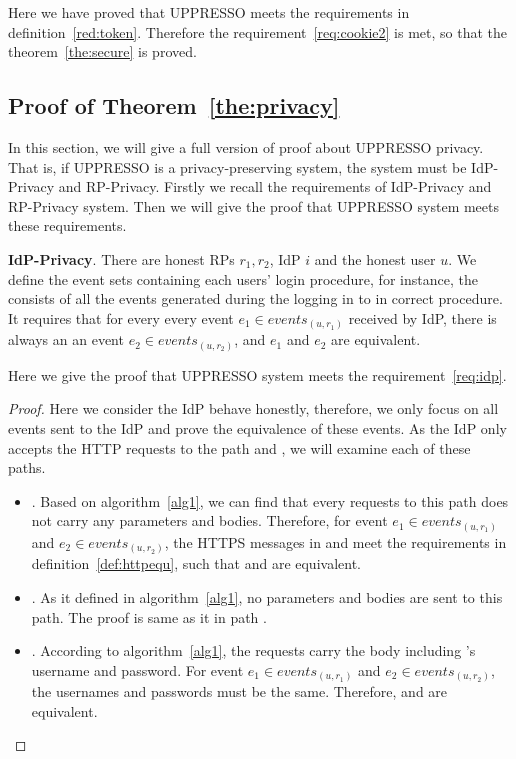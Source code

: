 \begin{appendices}
Here we have proved that UPPRESSO meets the requirements in definition~\ref{red:token}. Therefore the requirement~\ref{req:cookie2} is met, so that the theorem~\ref{the:secure} is proved.

\subsection{Proof of Theorem~\ref{the:privacy}}
In this section, we will give a full version of proof about UPPRESSO privacy. That is, if UPPRESSO is a privacy-preserving system, the system must be IdP-Privacy and RP-Privacy. Firstly we recall the requirements of IdP-Privacy and RP-Privacy system. Then we will give the proof that UPPRESSO system meets these requirements. 
\begin{req}
\textbf{IdP-Privacy}. There are honest RPs $r_1, r_2$, IdP $i$ and the honest user $u$. We define the event sets containing each users' login procedure, for instance, the  consists of all the events generated during the  logging in to  in correct procedure. It requires that for every every event $e_1 \in events_{(u, r_1)}$ received by IdP, there is always an  an event $e_2 \in events_{(u, r_2)}$, and $e_1$ and $e_2$ are equivalent.
\label{req:idp}
\end{req}
Here we give the proof that UPPRESSO system meets the requirement~\ref{req:idp}.
\begin{proof}
Here we consider the IdP behave honestly, therefore, we only focus on all events sent to the IdP and prove the equivalence of these events. As the IdP only accepts the HTTP requests to the path  and , we will examine each of these paths.
\begin{itemize}
\item {}. Based on algorithm~\ref{alg1}, we can find that every requests to this path does not carry any parameters and bodies. Therefore, for event $e_1 \in events_{(u, r_1)}$ and $e_2 \in events_{(u, r_2)}$, the HTTPS messages in  and  meet the requirements in definition~\ref{def:httpequ}, such that  and  are equivalent.
\item {}. As it defined in algorithm~\ref{alg1}, no parameters and bodies are sent to this path. The proof is same as it in path . 
\item {}. According to  algorithm~\ref{alg1}, the requests carry the body including 's username and password. For event $e_1 \in events_{(u, r_1)}$ and $e_2 \in events_{(u, r_2)}$, the usernames and passwords must be the same. Therefore,  and  are equivalent. 

\end{itemize}
\end{proof}
\end{appendices}
